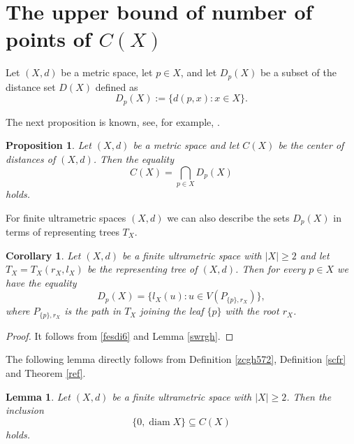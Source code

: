 \documentclass[pdflatex,sn-mathphys-num]{sn-jnl}%
\theoremstyle{thmstyleone}%
\newtheorem{Lemma}[Theorem]{Lemma}
\newtheorem{Proposition}[Theorem]{Proposition}
\newtheorem{Corollary}[Theorem]{Corollary}
\theoremstyle{thmstyletwo}%
\theoremstyle{thmstylethree}%
\theoremstyle{thmstyletwo}%
\theoremstyle{thmstylethree}%
\begin{document}
\section{The upper bound of number of points of $C(X)$}\label{sec3}



Let $(X,d)$ be a metric space,  let $p \in X$, and  
let $D_p(X)$ be a subset of 
the distance set $D(X)$
 defined as
\begin{equation}
    \label{fesdi6}
D_p(X) := \{ d(p,x) : x \in X \}. 
\end{equation}


The next proposition is known, see, for example, \cite{NPT2025}. 




\begin{Proposition}\label{ugrdd}
Let $(X,d)$ be a metric space and let $C(X)$ be the center of distances of $(X,d)$. Then the equality 
\begin{equation*}
C(X) = \bigcap_{p \in X} D_p(X) 
\end{equation*}
holds.
\end{Proposition}



For finite ultrametric spaces $(X,d)$ we can also describe the sets $D_p(X)$ in terms of representing trees $T_X$.


\begin{Corollary}\label{sefugi}
Let $(X,d)$ be a finite  ultrametric space with $|X|\geq 2$ and let 
\(
T_X=T_X(r_X,l_X)
\)
be the representing tree of \((X,d)\).
Then for every $p\in X$  we have the equality
\begin{equation}
    \label{imgt}
D_p(X)=\{l_X(u) : u \in V(P_{\{p\},r_X})\},
\end{equation}
where \(P_{\{p\},r_X}\) is the path in \(T_X\) joining the leaf \(\{p\}\) with the root \(r_X\).
\end{Corollary}


\begin{proof}
It follows from \eqref{fesdi6} and Lemma \ref{swrgh}.
\end{proof}




The following lemma directly follows from Definition \ref{zcgh572}, Definition \ref{scfr} and Theorem \ref{ref}.


\begin{Lemma}\label{l31}
Let $(X,d)$ be a finite ultrametric space with $|X|\geq 2$. Then the inclusion
\begin{equation*}
\{0,\operatorname{diam} X \} \subseteq C(X)
\end{equation*}
holds.
\end{Lemma}
\end{document}
